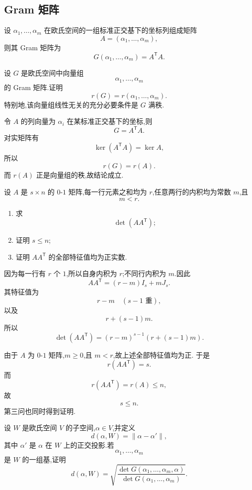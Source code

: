\subsection{Gram 矩阵}

\begin{proposition}[\markstar]
设 $\alpha_1,\ldots,\alpha_m$ 在欧氏空间的一组标准正交基下的坐标列组成矩阵
\[
A=(\alpha_1,\ldots,\alpha_m),
\]
则其 Gram 矩阵为
\[
G(\alpha_1,\ldots,\alpha_m)=A^{\mathsf T}A.
\]
\end{proposition}


\begin{example}
设 $G$ 是欧氏空间中向量组
\[
\alpha_1,\ldots,\alpha_m
\]
的 Gram 矩阵.证明
\[
r(G)=r(\alpha_1,\ldots,\alpha_m).
\]
特别地,该向量组线性无关的充分必要条件是 $G$ 满秩.
\end{example}
\exampleblank

\begin{solution}
令 $A$ 的列向量为 $\alpha_i$ 在某标准正交基下的坐标,则
\[
G=A^{\mathsf T}A.
\]
对实矩阵有
\[
\ker(A^{\mathsf T}A)=\ker A,
\]
所以
\[
r(G)=r(A).
\]
而 $r(A)$ 正是向量组的秩,故结论成立.
\end{solution}


\begin{example}
设 $A$ 是 $s\times n$ 的 $0$-$1$ 矩阵,每一行元素之和均为 $r$,任意两行的内积均为常数 $m$,且
\[
m<r.
\]
\begin{enumerate}
    \item 求
    \[
    \det(AA^{\mathsf T});
    \]
    \item 证明 $s\le n$;
    \item 证明 $AA^{\mathsf T}$ 的全部特征值均为正实数.
\end{enumerate}
\end{example}
\exampleblank

\begin{solution}
因为每一行有 $r$ 个 $1$,所以自身内积为 $r$;不同行内积为 $m$.因此
\[
AA^{\mathsf T}
=
(r-m)I_s+mJ_s.
\]
其特征值为
\[
r-m
\quad(s-1\text{ 重}),
\]
以及
\[
r+(s-1)m.
\]
所以
\[
\boxed{
\det(AA^{\mathsf T})
=(r-m)^{s-1}\left(r+(s-1)m\right).
}
\]

由于 $A$ 为 $0$-$1$ 矩阵,$m\ge0$,且 $m<r$,故上述全部特征值均为正.
于是
\[
r(AA^{\mathsf T})=s.
\]
而
\[
r(AA^{\mathsf T})=r(A)\le n,
\]
故
\[
\boxed{s\le n}.
\]
第三问也同时得到证明.
\end{solution}


\begin{example}
设 $W$ 是欧氏空间 $V$ 的子空间,$\alpha\in V$,并定义
\[
d(\alpha,W)=\|\alpha-\alpha'\|,
\]
其中 $\alpha'$ 是 $\alpha$ 在 $W$ 上的正交投影.若
\[
\alpha_1,\ldots,\alpha_m
\]
是 $W$ 的一组基,证明
\[
\boxed{
 d(\alpha,W)
 =
 \sqrt{
 \dfrac{
 \det G(\alpha_1,\ldots,\alpha_m,\alpha)
 }{
 \det G(\alpha_1,\ldots,\alpha_m)
 }
 }.
}
\]
\end{example}
\exampleblank

